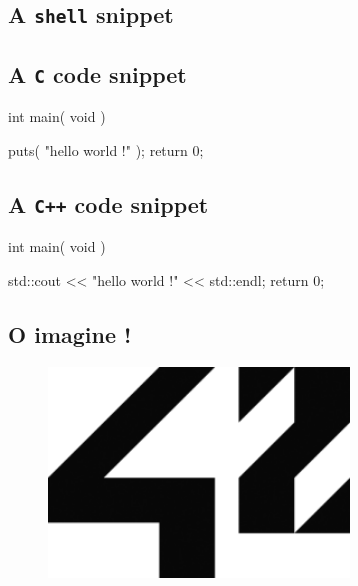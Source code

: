 \documentclass{42-en}
\begin{document}
        \newpage


        \subsection{A \texttt{shell} snippet}




        \subsection{A \texttt{C} code snippet}

           \begin{42ccode}
int main( void ) {

    puts( "hello world !" );
    return 0;
}
\end{42ccode}


        \subsection{A \texttt{C++} code snippet}

            \begin{42cppcode}
int main( void ) {

    std::cout << "hello world !" << std::endl;
    return 0;
}
\end{42cppcode}


        \subsection{O imagine !}

            \begin{figure}[H]
                \begin{center}
                    \includegraphics[width=8cm]{42.png}
                \end{center}
            \end{figure}
\end{document}
